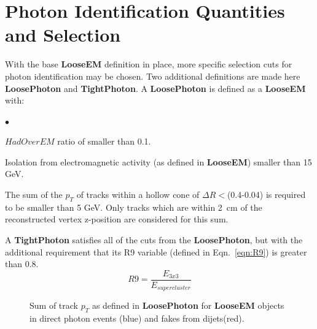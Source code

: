 \documentclass{cmspaper}
\begin{document}
\section{Photon Identification Quantities and Selection}
With the base {\bf LooseEM} definition in place, more specific selection cuts for photon identification may be chosen.  Two additional 
definitions are made here {\bf LoosePhoton} and {\bf TightPhoton}.  
A {\bf LoosePhoton} is defined as a {\bf LooseEM} with:
\begin{list}{$\bullet$}
 \item{$HadOverEM$ ratio of smaller than 0.1.}
\item{Isolation from electromagnetic activity (as defined in {\bf LooseEM}) smaller than 15 GeV.}
\item{The sum of the $p_{T}$ of tracks within a hollow cone of $\Delta R<$(0.4-0.04) is required to be smaller than 5 GeV.  Only tracks which are
within 2~cm of the reconstructed vertex z-position are considered for this sum.}
\end{list}
A {\bf TightPhoton} satisfies all of the cuts from the {\bf LoosePhoton}, but with the additional requirement that its R9 variable (defined in Eqn.~\ref{eqn:R9}) is greater than 0.8.
\begin{equation}
 R9 = \frac{E_{3x3}}{E_{supercluster}}
\end{equation}\label{eqn:R9}
\begin{figure}[hbtp]
  \begin{center}
    \caption{Sum of track $p_T$ as defined in {\bf LoosePhoton} for {\bf LooseEM} objects in direct photon events (blue) and fakes
from dijets(red).}
    \label{fig:Photonid_trkiso}
  \end{center}
\end{figure}
\end{document}
